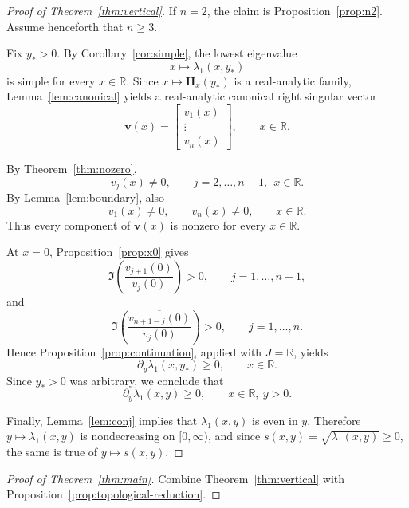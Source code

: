\documentclass[11pt]{article}
\numberwithin{equation}{section}
\begin{document}
\begin{proof}[Proof of Theorem~\ref{thm:vertical}]
If $n=2$, the claim is Proposition~\ref{prop:n2}.  Assume henceforth that
$n\ge3$.

Fix $y_*>0$.  By Corollary~\ref{cor:simple}, the lowest eigenvalue
\[
x\longmapsto \lambda_1(x,y_*)
\]
is simple for every $x\in\mathbb{R}$.  Since $x\mapsto \mathbf H_x(y_*)$ is a
real-analytic family, Lemma~\ref{lem:canonical} yields a real-analytic
canonical right singular vector
\[
\bm v(x)=
\begin{bmatrix}
v_1(x)\\
\vdots\\
v_n(x)
\end{bmatrix},
\qquad
x\in\mathbb{R}.
\]

By Theorem~\ref{thm:nozero},
\[
v_j(x)\neq0,
\qquad
j=2,\dots,n-1,\ \ x\in\mathbb{R}.
\]
By Lemma~\ref{lem:boundary}, also
\[
v_1(x)\neq0,
\qquad
v_n(x)\neq0,
\qquad
x\in\mathbb{R}.
\]
Thus every component of $\bm v(x)$ is nonzero for every $x\in\mathbb{R}$.

At $x=0$, Proposition~\ref{prop:x0} gives
\[
\Im\!\left(\frac{v_{j+1}(0)}{v_j(0)}\right)>0,
\qquad
j=1,\dots,n-1,
\]
and
\[
\Im\!\left(\frac{\overline{v_{n+1-j}(0)}}{v_j(0)}\right)>0,
\qquad
j=1,\dots,n.
\]
Hence Proposition~\ref{prop:continuation}, applied with $J=\mathbb{R}$, yields
\[
\partial_y\lambda_1(x,y_*)\ge0,
\qquad
x\in\mathbb{R}.
\]
Since $y_*>0$ was arbitrary, we conclude that
\[
\partial_y\lambda_1(x,y)\ge0,
\qquad
x\in\mathbb{R},\ y>0.
\]

Finally, Lemma~\ref{lem:conj} implies that $\lambda_1(x,y)$ is even in $y$.
Therefore $y\mapsto \lambda_1(x,y)$ is nondecreasing on $[0,\infty)$, and
since $s(x,y)=\sqrt{\lambda_1(x,y)}\ge0$, the same is true of $y\mapsto s(x,y)$.
\end{proof}

\begin{proof}[Proof of Theorem~\ref{thm:main}]
Combine Theorem~\ref{thm:vertical} with
Proposition~\ref{prop:topological-reduction}.
\end{proof}
\end{document}
